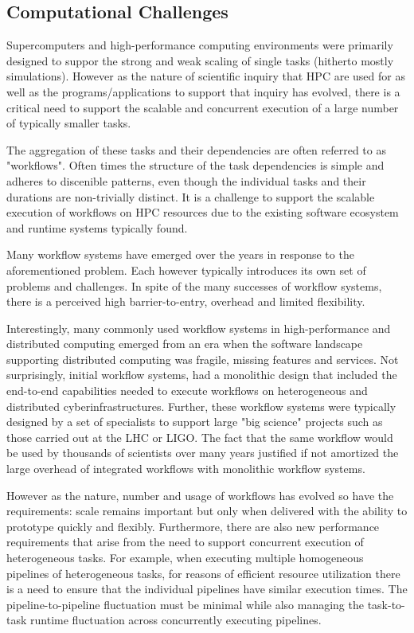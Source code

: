 
\subsection{Computational Challenges}

Supercomputers and high-performance computing environments were primarily
designed to suppor the strong and weak scaling of single tasks (hitherto
mostly simulations). However as the nature of scientific inquiry that HPC are
used for as well as the programs/applications to support that inquiry has
evolved, there is a critical need to support the scalable and concurrent
execution of a large number of typically smaller tasks.

The aggregation of these tasks and their dependencies are often referred to as
"workflows". Often times the structure of the task dependencies is
simple and adheres to discenible patterns, even though the individual tasks
and their durations are non-trivially distinct. It is a challenge
to support the scalable execution of workflows on HPC resources due to the
existing software ecosystem and runtime systems typically found.

Many workflow systems have emerged over the years in response to the
aforementioned problem. Each however typically introduces its own set of
problems and challenges. In spite of the many successes of workflow systems,
there is a perceived high barrier-to-entry, overhead and limited flexibility.

Interestingly, many commonly used workflow systems in high-performance and
distributed computing emerged from an era when the software landscape
supporting distributed computing was fragile, missing features and services.
Not surprisingly, initial workflow systems, had a monolithic design that
included the end-to-end capabilities needed to execute workflows on
heterogeneous and distributed cyberinfrastructures. Further, these workflow
systems were typically designed by a set of specialists to support large "big
science" projects such as those carried out at the LHC or LIGO. The fact that
the same workflow would be used by thousands of scientists over many years
justified if not amortized the large overhead of integrated workflows with
monolithic workflow systems.

However as the nature, number and usage of workflows has evolved so have the
requirements: scale remains important but only when delivered with the ability
to prototype quickly and flexibly. Furthermore, there are also new performance
requirements that arise from the need to support concurrent execution of
heterogeneous tasks. For example, when executing multiple homogeneous
pipelines of heterogeneous tasks, for reasons of efficient resource
utilization there is a need to ensure that the individual pipelines have
similar execution times. The pipeline-to-pipeline fluctuation must be minimal
while also managing the task-to-task runtime fluctuation across concurrently
executing pipelines. 

